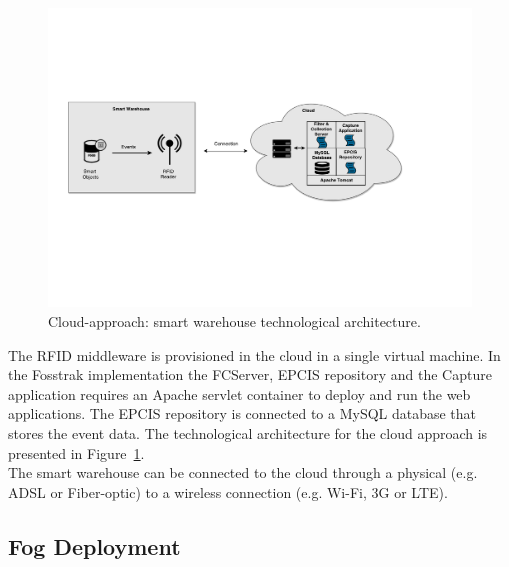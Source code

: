\begin{figure}
  \centering
  \includegraphics[width=\textwidth]{./images/implementation_cloud_architecture}
  \caption[Cloud-approach: technological architecture.]{Cloud-approach: smart warehouse technological architecture.}
  \label{fig:implementation_cloud_architecture}
\end{figure}

The \gls{RFID} middleware is provisioned in the cloud in a single virtual machine. In the
Fosstrak implementation the \gls{FCServer}, \gls{EPCIS} repository and the Capture application
requires an Apache servlet container to deploy and run the web applications. The \gls{EPCIS}
repository is connected to a MySQL database that stores the event data. The technological architecture
for the cloud approach is presented in Figure~\ref{fig:implementation_cloud_architecture}.\\

The smart warehouse can be connected to the cloud through a physical (e.g. \gls{ADSL} or Fiber-optic)
to a wireless connection (e.g. Wi-Fi, 3G or \gls{LTE}).

\subsection{Fog Deployment}
\label{sub:imp_smart_warehouse_fog}

